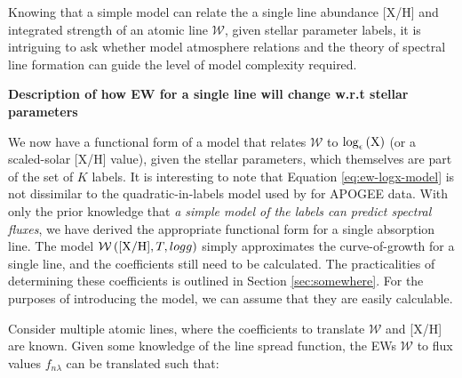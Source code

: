 \documentclass[useAMS,usenatbib]{mn2e}
\begin{document}








Knowing that a simple model can relate the a single line abundance [X/H] and integrated strength of an atomic line $\mathcal{W}$, given stellar parameter labels, it is intriguing to ask whether model atmosphere relations and the theory of spectral line formation can guide the level of model complexity required.

\textbf{Description of how EW for a single line will change w.r.t stellar parameters}

We now have a functional form of a model that relates $\mathcal{W}$ to $\log_\epsilon\left({\textrm X}\right)$ (or a scaled-solar [X/H] value), given the stellar parameters, which themselves are part of the set of $K$ labels. It is interesting to note that Equation \ref{eq:ew-logx-model} is not dissimilar to the quadratic-in-labels model used by \citet{Ness15a} for APOGEE data. With only the prior knowledge that \textit{a simple model of the labels can predict spectral fluxes}, we have derived the appropriate functional form for a single absorption line. The model $\mathcal{W}\left({\rm [X/H]}, T, logg\right)$ simply approximates the curve-of-growth for a single line, and the coefficients still need to be calculated. The practicalities of determining these coefficients is outlined in Section \ref{sec:somewhere}. For the purposes of introducing the model, we can assume that they are easily calculable.

Consider multiple atomic lines, where the coefficients to translate $\mathcal{W}$ and [X/H] are known. Given some knowledge of the line spread function, the EWs $\mathcal{W}$ to flux values $f_{n\lambda}$ can be translated such that:
\end{document}
